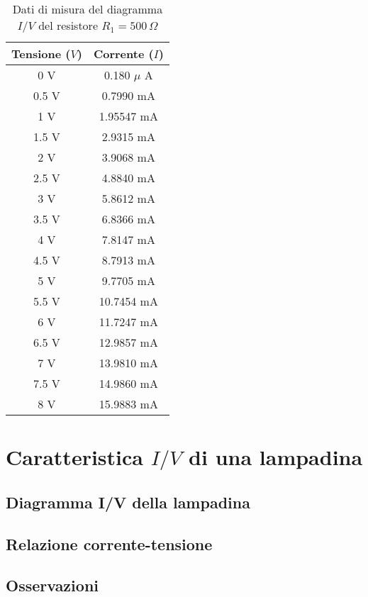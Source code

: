 \documentclass{article}
\begin{document}
\begin{table}[h!]
\centering
\begin{tabular}{|c|c|}
\hline
\textbf{Tensione (\( V \))} & \textbf{Corrente (\( I \))}  \\
\hline
0 V        & 0.180 \(\mu\) A   \\
0.5 V      & 0.7990 mA  \\
1 V        & 1.95547 mA \\
1.5 V      & 2.9315 mA  \\
2 V        & 3.9068 mA  \\
2.5 V      & 4.8840 mA  \\
3 V        & 5.8612 mA  \\
3.5 V      & 6.8366 mA  \\
4 V        & 7.8147 mA  \\
4.5 V      & 8.7913 mA  \\
5 V        & 9.7705 mA  \\
5.5 V      & 10.7454 mA \\
6 V        & 11.7247 mA \\
6.5 V      & 12.9857 mA \\
7 V        & 13.9810 mA \\
7.5 V      & 14.9860 mA \\
8 V        & 15.9883 mA \\
\hline
\end{tabular}
\caption{Dati di misura del diagramma \( I/V \) del resistore \( R_1 = 500 \, \Omega \)}
\end{table}


\section{Caratteristica \( I/V \) di una lampadina}
\subsection{Diagramma I/V della lampadina}
\subsection{Relazione corrente-tensione}

\subsection{Osservazioni}
\end{document}
